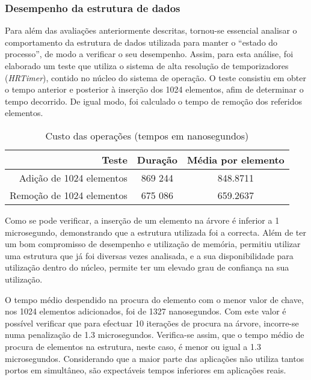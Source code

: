 \subsubsection{Desempenho da estrutura de dados}

Para além das avaliações anteriormente descritas, tornou-se essencial analisar o comportamento da estrutura de dados utilizada para manter o “estado do processo”, de modo a verificar o seu desempenho. 
Assim, para esta análise, foi elaborado um teste que utiliza o sistema de alta resolução de temporizadores (\textit{HRTimer}), contido no núcleo do sistema de operação.
O teste consistiu em obter o tempo anterior e posterior à inserção dos 1024 elementos, afim de determinar o tempo decorrido.
De igual modo, foi calculado o tempo de remoção dos referidos elementos.

\begin{table}
\begin{center}
\caption{Custo das operações (tempos em nanosegundos)}
\begin{tabular}{ | r | c | c | }
\hline
\hspace{1cm} Teste \hspace{1.5cm} & \hspace{1cm}Duração\hspace{1cm} &  Média por
elemento \\
\hline
Adição de 1024 elementos & 869 244 & 848.8711 \\
\hline
Remoção de 1024 elementos & 675 086 & 659.2637\\
\hline

\hline
\end{tabular}
\label{tab:tree_info}
\end{center}
\end{table}

Como se pode verificar, a inserção de um elemento na árvore é inferior a 1 microsegundo, demonstrando que a estrutura utilizada foi a correcta.
Além de ter um bom compromisso de desempenho e utilização de memória, permitiu utilizar uma estrutura que já foi diversas vezes analisada, e a sua disponibilidade para utilização dentro do núcleo, permite ter um elevado grau de confiança na sua utilização.

O tempo médio despendido na procura do elemento com o menor valor de chave, nos 1024 elementos adicionados, foi de 1327 nanosegundos.
Com este valor é possível verificar que para efectuar 10 iterações de procura na árvore, incorre-se numa penalização de 1.3 microsegundos. 
Verifica-se assim, que o tempo médio de procura de elementos na estrutura, neste caso, é menor ou igual a 1.3 microsegundos.
Considerando que a maior parte das aplicações não utiliza tantos portos em simultâneo, são expectáveis tempos inferiores em aplicações reais.

